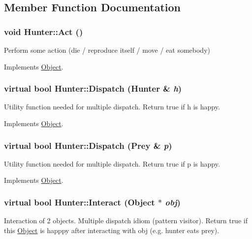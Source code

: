 \subsection{Member Function Documentation}
\hypertarget{classHunter_ac8bed4eeb2bfebcf7df72ba7359ac204}{
\subsubsection[{Act}]{\setlength{\rightskip}{0pt plus 5cm}void Hunter::Act ()}}
\label{classHunter_ac8bed4eeb2bfebcf7df72ba7359ac204}
Perform some action (die / reproduce itself / move / eat somebody) 

Implements \hyperlink{classObject_a683b351ee47dc69c4117cb9017c467d6}{Object}.

\hypertarget{classHunter_aa73667bb3b20a06d8c398eb2760e2902}{
\subsubsection[{Dispatch}]{\setlength{\rightskip}{0pt plus 5cm}virtual bool Hunter::Dispatch ({\bf Hunter} \& {\em h})}}
\label{classHunter_aa73667bb3b20a06d8c398eb2760e2902}
Utility function needed for multiple dispatch. Return true if h is happy. 

Implements \hyperlink{classObject_a0d0e1f0456837f6736913b1ba374f11d}{Object}.

\hypertarget{classHunter_aac1480382681187d650a9122dee9971c}{
\subsubsection[{Dispatch}]{\setlength{\rightskip}{0pt plus 5cm}virtual bool Hunter::Dispatch ({\bf Prey} \& {\em p})}}
\label{classHunter_aac1480382681187d650a9122dee9971c}
Utility function needed for multiple dispatch. Return true if p is happy. 

Implements \hyperlink{classObject_a70097e3ad4433aec0dd0b938fcedfeca}{Object}.

\hypertarget{classHunter_aad1bd13407503496a74ae1a6c689e64f}{
\subsubsection[{Interact}]{\setlength{\rightskip}{0pt plus 5cm}virtual bool Hunter::Interact ({\bf Object} $\ast$ {\em obj})}}
\label{classHunter_aad1bd13407503496a74ae1a6c689e64f}
Interaction of 2 objects. Multiple dispatch idiom (pattern visitor). Return true if this \hyperlink{classObject}{Object} is happpy after interacting with obj (e.g. hunter eats prey). 

